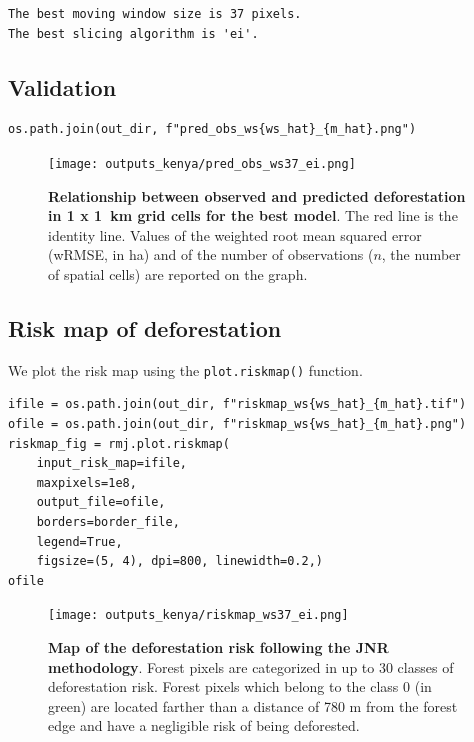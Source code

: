 \documentclass[paper=a4, 12pt, DIV=12]{scrartcl}
\begin{document}
\begin{verbatim}
The best moving window size is 37 pixels.
The best slicing algorithm is 'ei'.
\end{verbatim}

\subsection{Validation}
\label{sec:org4d1246f}

\begin{verbatim}
os.path.join(out_dir, f"pred_obs_ws{ws_hat}_{m_hat}.png")
\end{verbatim}

\begin{figure}[H]
\centering
\texttt{[image: outputs\_kenya/pred\_obs\_ws37\_ei.png]}
\caption{\label{fig:org8f8f1c2}\textbf{Relationship between observed and predicted deforestation in 1 x 1 km grid cells for the best model}. The red line is the identity line. Values of the weighted root mean squared error (wRMSE, in ha) and of the number of observations (\(n\), the number of spatial cells) are reported on the graph.}
\end{figure}

\subsection{Risk map of deforestation}
\label{sec:org4f408e2}

We plot the risk map using the \texttt{plot.riskmap()} function.

\begin{verbatim}
ifile = os.path.join(out_dir, f"riskmap_ws{ws_hat}_{m_hat}.tif")
ofile = os.path.join(out_dir, f"riskmap_ws{ws_hat}_{m_hat}.png")
riskmap_fig = rmj.plot.riskmap(
    input_risk_map=ifile,
    maxpixels=1e8,
    output_file=ofile,
    borders=border_file,
    legend=True,
    figsize=(5, 4), dpi=800, linewidth=0.2,)
ofile
\end{verbatim}

\begin{figure}[H]
\centering
\texttt{[image: outputs\_kenya/riskmap\_ws37\_ei.png]}
\caption{\label{fig:org1f66a0c}\textbf{Map of the deforestation risk following the JNR methodology}. Forest pixels are categorized in up to 30 classes of deforestation risk. Forest pixels which belong to the class 0 (in green) are located farther than a distance of 780 m from the forest edge and have a negligible risk of being deforested.}
\end{figure}
\end{document}
